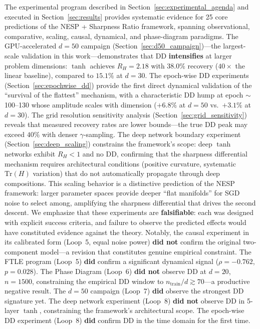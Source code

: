 \documentclass[
  journal=largetwo,
  simfonts=false,
  year=2025,
  volume=37,
]{cup-journal}
\begin{document}
The experimental program described in Section~\ref{sec:experimental_agenda} and executed in Section~\ref{sec:results} provides systematic evidence for 25 core predictions of the NESP + Sharpness Ratio framework, spanning observational, comparative, scaling, causal, dynamical, and phase-diagram paradigms. The GPU-accelerated $d=50$ campaign (Section~\ref{sec:d50_campaign})---the largest-scale validation in this work---demonstrates that DD \textbf{intensifies} at larger problem dimensions: $\tanh$ achieves $R_H=2.18$ with $38.0\%$ recovery ($40\times$ the linear baseline), compared to $15.1\%$ at $d=30$. The epoch-wise DD experiments (Section~\ref{sec:epochwise_dd}) provide the first direct dynamical validation of the ``survival of the flattest'' mechanism, with a characteristic DD hump at epoch $\sim$100--130 whose amplitude scales with dimension ($+6.8\%$ at $d=50$ vs.\ $+3.1\%$ at $d=30$). The grid resolution sensitivity analysis (Section~\ref{sec:grid_sensitivity}) reveals that measured recovery rates are lower bounds---the true DD peak may exceed $40\%$ with denser $\gamma$-sampling. The deep network boundary experiment (Section~\ref{sec:deep_scaling}) constrains the framework's scope: deep $\tanh$ networks exhibit $R_H < 1$ and no DD, confirming that the sharpness differential mechanism requires architectural conditions (positive curvature, systematic $\mathrm{Tr}(H)$ variation) that do not automatically propagate through deep compositions. This scaling behavior is a distinctive prediction of the NESP framework: larger parameter spaces provide deeper ``flat manifolds'' for SGD noise to select among, amplifying the sharpness differential that drives the second descent. We emphasize that these experiments are \textbf{falsifiable}: each was designed with explicit success criteria, and failure to observe the predicted effects would have constituted evidence against the theory. Notably, the causal experiment in its calibrated form (Loop~5, equal noise power) \textbf{did not} confirm the original two-component model---a revision that constitutes genuine empirical constraint. The FTLE program (Loop~5) \textbf{did} confirm a significant dynamical signal ($\rho=-0.762$, $p=0.028$). The Phase Diagram (Loop~6) \textbf{did not} observe DD at $d=20$, $n=1500$, constraining the empirical DD window to $n_{\mathrm{train}}/d \gtrsim 70$---a productive negative result. The $d=50$ campaign (Loop~7) \textbf{did} observe the strongest DD signature yet. The deep network experiment (Loop~8) \textbf{did not} observe DD in 5-layer $\tanh$, constraining the framework's architectural scope. The epoch-wise DD experiment (Loop~8) \textbf{did} confirm DD in the time domain for the first time.
\end{document}
